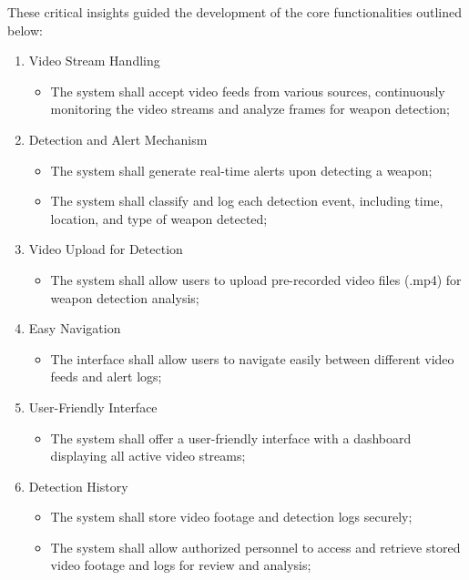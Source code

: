 These critical insights guided the development of the core functionalities outlined below:

\begin{enumerate}
    \item Video Stream Handling
    \begin{itemize}
    \item The system shall accept video feeds from various sources, continuously monitoring the video streams 
    and analyze frames for weapon detection;
    \end{itemize}
    \item Detection and Alert Mechanism
    \begin{itemize}
    \item The system shall generate real-time alerts upon detecting a weapon;
    \item The system shall classify and log each detection event, including time, location, and type of weapon detected;
    \end{itemize}
    \item Video Upload for Detection
    \begin{itemize}
        \item The system shall allow users to upload pre-recorded video files (.mp4) for weapon detection analysis;
    \end{itemize}
    \item Easy Navigation
    \begin{itemize}
        \item The interface shall allow users to navigate easily between different video feeds and alert logs;
    \end{itemize}
    \item User-Friendly Interface
    \begin{itemize}
        \item The system shall offer a user-friendly interface with a dashboard displaying all active video streams;
    \end{itemize}
    \item Detection History
    \begin{itemize}
    \item The system shall store video footage and detection logs securely;
    \item The system shall allow authorized personnel to access and retrieve stored video footage and 
    logs for review and analysis;
    \end{itemize}
    \end{enumerate}

